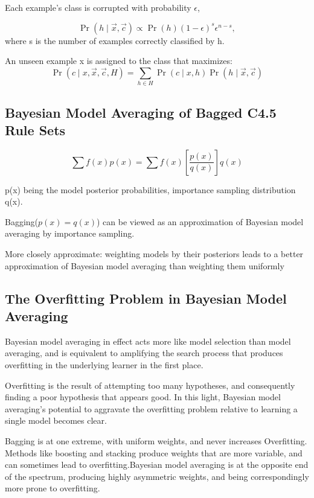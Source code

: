\documentclass{article}
\begin{document}
Each example’s class is corrupted with probability $\epsilon$,

\begin{equation}
    \operatorname{Pr}(h \mid \vec{x}, \vec{c}) \propto \operatorname{Pr}(h)(1-\epsilon)^{s} \epsilon^{n-s},
\end{equation}
where s is the number of examples correctly classiﬁed by h.

An unseen example x is assigned to the class that maximizes:
\begin{equation}
    \operatorname{Pr}(c \mid x, \vec{x}, \vec{c}, H)=\sum_{h \in H} \operatorname{Pr}(c \mid x, h) \operatorname{Pr}(h \mid \vec{x}, \vec{c})
\end{equation}

\subsection{Bayesian Model Averaging of Bagged C4.5 Rule Sets}

\begin{equation}
    \sum f(x) p(x)=\sum f(x)\left[\frac{p(x)}{q(x)}\right] q(x)
\end{equation}

p(x) being the model posterior probabilities, importance sampling distribution q(x).


Bagging($p(x) = q(x)$) can be viewed as an approximation of Bayesian model averaging by importance sampling.

More closely approximate: weighting models by their posteriors leads to a better approximation of Bayesian model averaging than weighting them uniformly


\subsection{The Overfitting Problem in Bayesian Model Averaging}

Bayesian model averaging in effect acts more like model selection than model averaging, and is equivalent to amplifying the search process that produces overﬁtting in the underlying learner in the first place.

Overfitting is the result of attempting too many hypotheses, and consequently ﬁnding a poor hypothesis that appears good. In this light, Bayesian model averaging’s potential to aggravate the overﬁtting problem relative to learning a single model becomes clear.

Bagging is at one extreme, with uniform weights, and never increases Overﬁtting. Methods like boosting and stacking produce weights that are more variable, and can sometimes lead to overﬁtting.Bayesian model averaging is at the opposite end of the spectrum, producing highly asymmetric weights, and being correspondingly more prone to overﬁtting.
\end{document}
